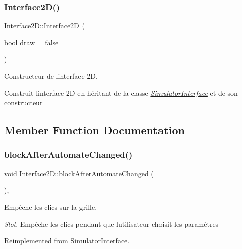\subsubsection{\texorpdfstring{Interface2\+D()}{Interface2D()}}
{\footnotesize\ttfamily Interface2\+D\+::\+Interface2D (\begin{DoxyParamCaption}\item[{bool}]{draw = {\ttfamily false} }\end{DoxyParamCaption})}



Constructeur de l\textquotesingle{}interface 2D. 

Construit l\textquotesingle{}interface 2D en héritant de la classe {\itshape \mbox{\hyperlink{class_simulator_interface}{Simulator\+Interface}}} et de son constructeur 

\subsection{Member Function Documentation}
\mbox{\label{class_interface2_d_ab20f92429f8ce70f149a465b3f6b48c4}} 
\subsubsection{\texorpdfstring{block\+After\+Automate\+Changed()}{blockAfterAutomateChanged()}}
{\footnotesize\ttfamily void Interface2\+D\+::block\+After\+Automate\+Changed (\begin{DoxyParamCaption}{ }\end{DoxyParamCaption})\hspace{0.3cm}{\ttfamily [protected]}, {\ttfamily [virtual]}}



Empêche les clics sur la grille. 

{\itshape Slot}. Empêche les clics pendant que l\textquotesingle{}utilisateur choisit les paramètres 

Reimplemented from \mbox{\hyperlink{class_simulator_interface}{Simulator\+Interface}}.

\mbox{\label{class_interface2_d_a44b18f9f41e84e09037e60e0163b801d}} 
